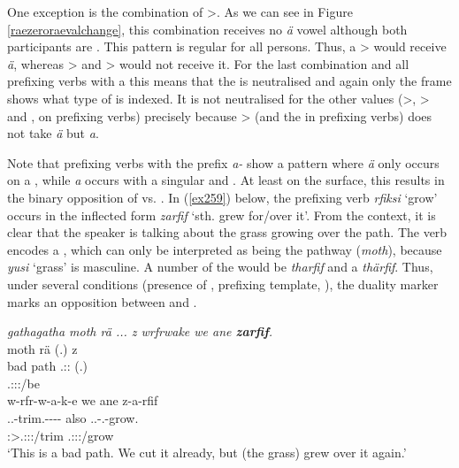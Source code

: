 One exception is the combination of \Sg>\Sg{}. As we can see in Figure \ref{raezeroraevalchange}, this combination receives no \emph{ä} vowel although both participants are . This pattern is regular for all persons. Thus, a \Pl>\Tsg{} would receive \emph{ä}, whereas \Du>\Tsg{} and \Sg>\Tsg{} would not receive it. For the last combination and all prefixing verbs with a \Tsg{} this means that the  is neutralised and again only the  frame shows what type of  is indexed. It is not neutralised for the other  values (\Sg>\Fsg{}, \Sg>\Ssg{} and \Fsg{}, \Ssg{} on prefixing verbs) precisely because \Sg>\Sg{} (and the \Sg{} in prefixing verbs) does not take \emph{ä} but \emph{a}.%

Note that prefixing verbs with the  prefix \emph{a-} show a pattern where \emph{ä} only occurs on a , while \emph{a} occurs with a singular and  . At least on the surface, this results in the binary opposition of  vs. . In (\ref{ex259}) below, the prefixing verb \emph{rfiksi} `grow' occurs in the inflected form \emph{zarfif} `sth. grew for/over it'. From the context, it is clear that the speaker is talking about the grass growing over the path. The verb encodes a  , which can only be interpreted as being the pathway (\emph{moth}), because \emph{yusi} `grass' is masculine. A  number of the  would be \emph{tharfif} and a  \emph{thärfif}. Thus, under several conditions (presence of , prefixing template, ), the duality marker marks an opposition between  and .

\begin{exe}
	\ex \emph{gathagatha moth rä ... z wrfrwake we ane \textbf{zarfif}.}\\
	 moth rä (.) z\\
	bad path \Tsg.\F:\Cop:\Ndu{} (.) \Iam{}\\
	{} {} \footnotesize{\Tsg.\F:\Sbj:\Nonpast:\Ipfv/be} {} {}\\
	\sn
	\glll w-rfr-w-a-k-e we ane z-a-rfif\\
	\Tsg.\F.\Alph-trim.\Ext-\Ndu-\Pst-\Lk-\Fnsg{} also \Dem{} \Tsg.\F.\Gam-\Ndu.\Vc-grow.\Rs\\
	\footnotesize{\Fpl:\Sbj>\Tsg.\F:\Obj:\Pst:\Ipfv/trim} {} {} \footnotesize{\Tsg.\F:\Io:\Rpst:\Pfv/grow}\\
	\trans `This is a bad path. We cut it already, but (the grass) grew over it again.'\\ 
	\label{ex259}
\end{exe}

